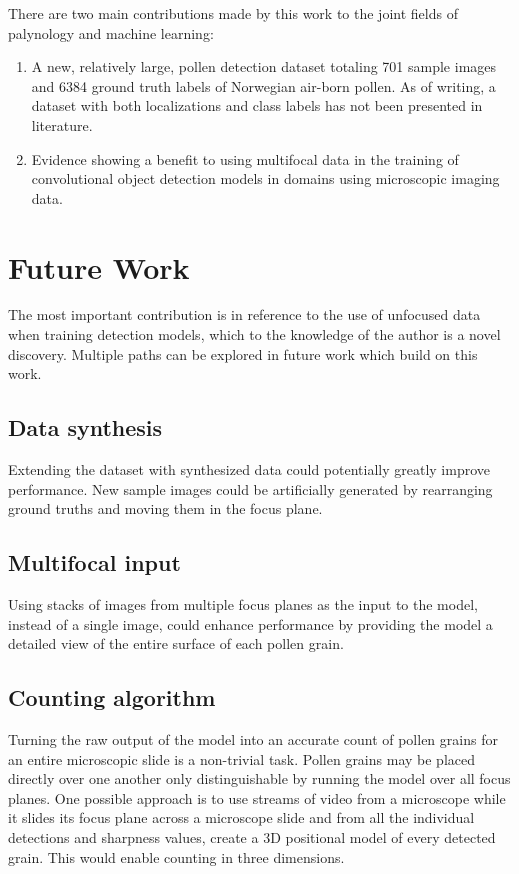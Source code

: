 There are two main contributions made by this work to the joint fields of palynology and machine learning:

\begin{enumerate}
    \item A new, relatively large, pollen detection dataset totaling 701 sample images and 6384 ground truth labels of Norwegian air-born pollen. As of writing, a dataset with both localizations and class labels has not been presented in literature.
    \item Evidence showing a benefit to using multifocal data in the training of convolutional object detection models in domains using microscopic imaging data. 
\end{enumerate}

\section{Future Work}
The most important contribution is in reference to the use of unfocused data when training detection models, which to the knowledge of the author is a novel discovery.
Multiple paths can be explored in future work which build on this work.

\subsection*{Data synthesis}
Extending the dataset with synthesized data could potentially greatly improve performance.
New sample images could be artificially generated by rearranging ground truths and moving them in the focus plane.

\subsection*{Multifocal input}
Using stacks of images from multiple focus planes as the input to the model, instead of a single image, could enhance performance by providing the model a detailed view of the entire surface of each pollen grain.

\subsection*{Counting algorithm}
Turning the raw output of the model into an accurate count of pollen grains for an entire microscopic slide is a non-trivial task.
Pollen grains may be placed directly over one another only distinguishable by running the model over all focus planes.
One possible approach is to use streams of video from a microscope while it slides its focus plane across a microscope slide and from all the individual detections and sharpness values, create a 3D positional model of every detected grain.
This would enable counting in three dimensions.

